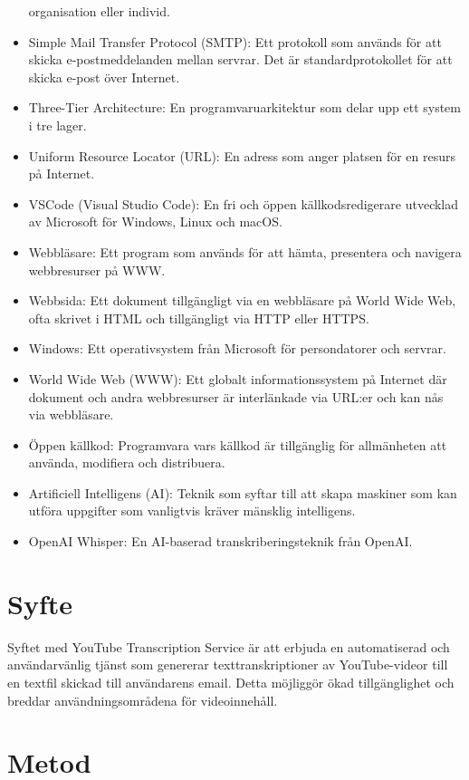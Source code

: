 \begin{itemize}
    organisation eller individ.
    \item Simple Mail Transfer Protocol (SMTP): Ett protokoll som används för
    att skicka e-postmeddelanden mellan servrar. Det är standardprotokollet för
    att skicka e-post över Internet.
    \item Three-Tier Architecture: En programvaruarkitektur som delar upp ett
    system i tre lager.
    \item Uniform Resource Locator (URL): En adress som anger platsen för en
    resurs på Internet.
    \item VSCode (Visual Studio Code): En fri och öppen källkodsredigerare
    utvecklad av Microsoft för Windows, Linux och macOS.
    \item Webbläsare: Ett program som används för att hämta, presentera och
    navigera webbresurser på WWW.
    \item Webbsida: Ett dokument tillgängligt via en webbläsare på World Wide
    Web, ofta skrivet i HTML och tillgängligt via HTTP eller HTTPS.
    \item Windows: Ett operativsystem från Microsoft för persondatorer och
    servrar.
    \item World Wide Web (WWW): Ett globalt informationssystem på Internet där
    dokument och andra webbresurser är interlänkade via URL:er och kan nås via
    webbläsare.
    \item Öppen källkod: Programvara vars källkod är tillgänglig för
    allmänheten att använda, modifiera och distribuera.
    \item Artificiell Intelligens (AI): Teknik som syftar till att skapa
    maskiner som kan utföra uppgifter som vanligtvis kräver mänsklig
    intelligens.
    \item OpenAI Whisper: En AI-baserad transkriberingsteknik från
    OpenAI.
\end{itemize}

\section{Syfte}
Syftet med YouTube Transcription Service är att erbjuda en automatiserad och
användarvänlig tjänst som genererar texttranskriptioner av YouTube-videor till
en textfil skickad till användarens email. Detta möjliggör ökad tillgänglighet
och breddar användningsområdena för videoinnehåll.

\section{Metod}


